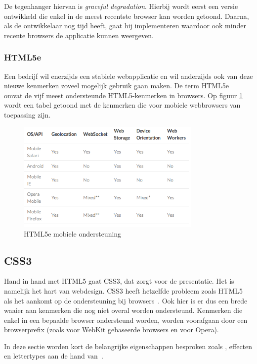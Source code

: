De tegenhanger hiervan is \emph{graceful degradation}. 
Hierbij wordt eerst een versie ontwikkeld die enkel in de meest recentste browser kan worden getoond. 
Daarna, als de ontwikkelaar nog tijd heeft, gaat hij  implementeren waardoor ook minder recente browsers de applicatie kunnen weergeven.

\subsubsection{HTML5e}
Een bedrijf wil enerzijds een stabiele webapplicatie en wil anderzijds ook van deze nieuwe kenmerken zoveel mogelijk gebruik gaan maken. 
De term HTML5e~\cite{Hales2012} omvat de vijf meest ondersteunde HTML5-kenmerken in browsers. 
Op figuur \ref{fig:html5e} wordt een tabel getoond met de kenmerken die voor mobiele webbrowsers van toepassing zijn.

\begin{figure}
  \centering
  \includegraphics[width=0.8\textwidth]{figuren/html5e}
  \caption{HTML5e mobiele ondersteuning~\cite{Hales2012}}
  \label{fig:html5e}
\end{figure}

\subsection{CSS3}
\label{ref:css3}
Hand in hand met HTML5 gaat CSS3, dat zorgt voor de presentatie. 
Het is namelijk het hart van webdesign. 
CSS3 heeft hetzelfde probleem zoals HTML5 als het aankomt op de ondersteuning bij browsers~\cite{MacDonald2011}. 
Ook hier is er dus een brede waaier aan kenmerken die nog niet overal worden ondersteund. 
Kenmerken die enkel in een bepaalde browser ondersteund worden, worden voorafgaan door een browserprefix (zoals  voor WebKit gebaseerde browsers en  voor Opera).

In deze sectie worden kort de belangrijke eigenschappen besproken zoals , effecten en lettertypes aan de hand van~\cite{MacDonald2011}.

